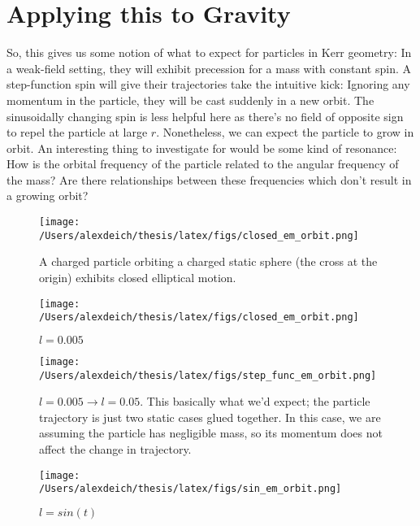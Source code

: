 \documentclass[11pt]{article}
\begin{document}
\section{Applying this to Gravity}
So, this gives us some notion of what to expect for particles in Kerr geometry:  In a weak-field setting, they will exhibit precession for a mass with constant spin.  A step-function spin will give their trajectories take the intuitive kick:  Ignoring any momentum in the particle, they will be cast suddenly in a new orbit.  The sinusoidally changing spin is less helpful here as there's no field of opposite sign to repel the particle at large $r$.  Nonetheless, we can expect the particle to grow in orbit.  An interesting thing to investigate for would be some kind of resonance:  How is the orbital frequency of the particle related to the angular frequency of the mass?  Are there relationships between these frequencies which don't result in a growing orbit?
\newpage
\begin{figure}[h]
  \begin{center}
    \texttt{[image: /Users/alexdeich/thesis/latex/figs/closed\_em\_orbit.png]}
  \end{center}
  \caption{A charged particle orbiting a charged static sphere (the cross at the origin) exhibits closed elliptical motion.}
  \label{fig:closed_em_orbit}
\end{figure}

\begin{figure}[h]
  \begin{center}
    \texttt{[image: /Users/alexdeich/thesis/latex/figs/closed\_em\_orbit.png]}
  \end{center}
  \caption{$l = 0.005$}
  \label{fig:constant_l_em_orbit}
\end{figure}

\begin{figure}[h]
  \begin{center}
    \texttt{[image: /Users/alexdeich/thesis/latex/figs/step\_func\_em\_orbit.png]}
  \end{center}
  \caption{$l = 0.005 \rightarrow l=0.05$.  This basically what we'd expect; the particle trajectory is just two static cases glued together.  In this case, we are assuming the particle has negligible mass, so its momentum does not affect the change in trajectory.}
  \label{fig:step_func_em_orbit}
\end{figure}

\begin{figure}[h]
  \begin{center}
    \texttt{[image: /Users/alexdeich/thesis/latex/figs/sin\_em\_orbit.png]}
  \end{center}
  \caption{$l = sin(t)$}
  \label{fig:sin_em_orbit}
\end{figure}
\end{document}
